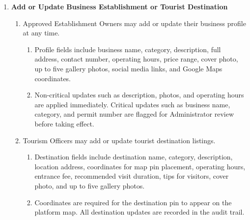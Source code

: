 \documentclass{research}
\begin{document}
\begin{enumerate}
    \item \textbf{Add or Update Business Establishment or Tourist Destination}
    \begin{enumerate}
        \item Approved Establishment Owners may add or update their business 
        profile at any time.
        \begin{enumerate}
            \item Profile fields include business name, category, 
            description, full address, contact number, operating hours, 
            price range, cover photo, up to five gallery photos, social 
            media links, and Google Maps coordinates.
            \item Non-critical updates such as description, photos, and 
            operating hours are applied immediately. Critical updates such 
            as business name, category, and permit number are flagged for 
            Administrator review before taking effect.
        \end{enumerate}
        \item Tourism Officers may add or update tourist destination 
        listings.
        \begin{enumerate}
            \item Destination fields include destination name, category, 
            description, location address, coordinates for map pin 
            placement, operating hours, entrance fee, recommended visit 
            duration, tips for visitors, cover photo, and up to five 
            gallery photos.
            \item Coordinates are required for the destination pin to 
            appear on the platform map. All destination updates are 
            recorded in the audit trail.
        \end{enumerate}
    \end{enumerate}


\end{enumerate}
\end{document}
